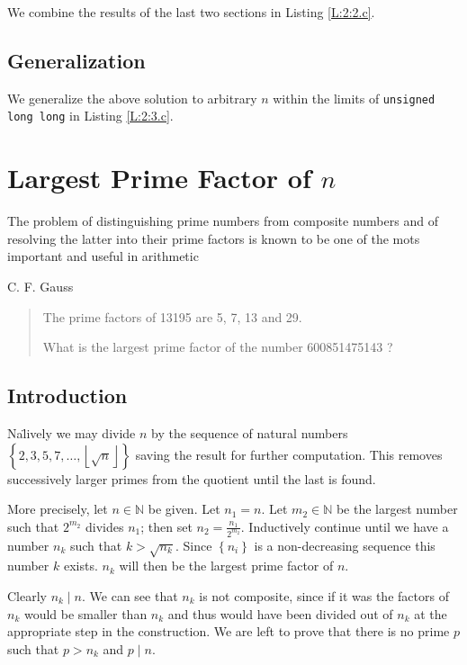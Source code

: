 \documentclass[oneside,12pt]{book}   	%
\newcounter{ex}
\newcounter{pr}
\theoremstyle{definition}
\newcommand{\set}[1]{\left\{#1\right\}}
\newcommand{\floor}[1]{\left\lfloor #1 \right\rfloor}
\begin{document}
\begin{spacing}{1.618}
		We combine the results of the last two sections in Listing \ref{L:2:2.c}. 
	
		

	\section{Generalization}
	
		We generalize the above solution to arbitrary $n$ within the limits of \texttt{unsigned long long} in Listing \ref{L:2:3.c}. 
		
		

	\chapter{Largest Prime Factor of $n$}
		\epigraph{The problem of distinguishing prime numbers from composite numbers and of resolving the latter into their prime factors is known to be one of the mots important and useful in arithmetic}{C. F. Gauss}
		\begin{quote}
			The prime factors of 13195 are 5, 7, 13 and 29.

			What is the largest prime factor of the number 600851475143 ?
		\end{quote}
	
		\section{Introduction}
			Na\"lively we may divide $n$ by the sequence of natural numbers $\set{2, 3, 5, 7, \dots, \floor{\sqrt{n}}}$ saving the result for further computation. This removes successively larger primes from the quotient until the last is found.  
			
			More precisely, let $n\in \mathbb{N}$ be given. Let $n_1=n$. Let $m_2\in\mathbb{N}$ be the largest number such that $2^{m_2}$ divides $n_1$; then set $n_2=\frac{n_1}{2^{m_2}}$. Inductively continue until we have a number $n_k$ such that $k>\sqrt{n_k}$. Since $\set{n_i}$ is a non-decreasing sequence this number $k$ exists. $n_k$ will then be the largest prime factor of $n$. 
			
			Clearly $n_k\mid n$. We can see that $n_k$ is not composite, since if it was the factors of $n_k$ would be smaller than $n_k$ and thus would have been divided out of $n_k$ at the appropriate step in the construction. We are left to prove that there is no prime $p$ such that $p>n_k$ and $p\mid n$. 
			

\end{spacing}
\end{document}
